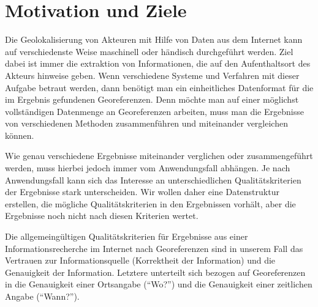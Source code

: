 \section{Motivation und Ziele}

Die Geolokalisierung von Akteuren mit Hilfe von Daten aus dem Internet kann auf verschiedenste Weise maschinell oder händisch durchgeführt werden. Ziel dabei ist immer die extraktion von Informationen, die auf den Aufenthaltsort des Akteurs hinweise geben. Wenn verschiedene Systeme und Verfahren mit dieser Aufgabe betraut werden, dann benötigt man ein einheitliches Datenformat für die im Ergebnis gefundenen Georeferenzen. Denn möchte man auf einer möglichst vollständigen Datenmenge an Georeferenzen arbeiten, muss man die Ergebnisse von verschiedenen Methoden zusammenführen und miteinander vergleichen können.

Wie genau verschiedene Ergebnisse miteinander verglichen oder zusammengeführt werden, muss hierbei jedoch immer vom Anwendungsfall abhängen. Je nach Anwendungsfall kann sich das Interesse an unterschiedlichen Qualitätskriterien der Ergebnisse stark unterscheiden. Wir wollen daher eine Datenstruktur erstellen, die mögliche Qualitätskriterien in den Ergebnissen vorhält, aber die Ergebnisse noch nicht nach diesen Kriterien wertet.

Die allgemeingültigen Qualitätskriterien für Ergebnisse aus einer Informationsrecherche im Internet nach Georeferenzen sind in unserem Fall das Vertrauen zur Informationsquelle (Korrektheit der Information) und die Genauigkeit der Information. Letztere  unterteilt sich bezogen auf Georeferenzen in die Genauigkeit einer Ortsangabe (``Wo?'') und die Genauigkeit einer zeitlichen Angabe (``Wann?'').